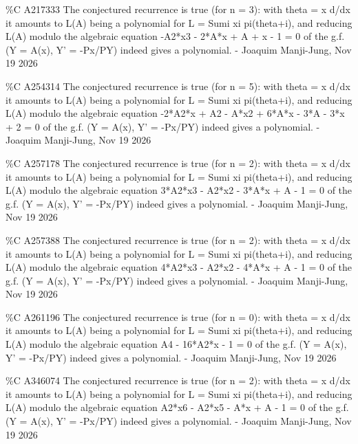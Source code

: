 {\%C A217333 The conjectured recurrence is true (for n = 3): with theta = x d/dx it amounts to L(A) being a polynomial for L = Sumi xi pi(theta+i), and reducing L(A) modulo the algebraic equation -A2*x3 - 2*A*x + A + x - 1 = 0 of the g.f. (Y = A(x), Y' = -Px/PY) indeed gives a polynomial. - Joaquim Manji-Jung, Nov 19 2026\par
\%C A254314 The conjectured recurrence is true (for n = 5): with theta = x d/dx it amounts to L(A) being a polynomial for L = Sumi xi pi(theta+i), and reducing L(A) modulo the algebraic equation -2*A2*x + A2 - A*x2 + 6*A*x - 3*A - 3*x + 2 = 0 of the g.f. (Y = A(x), Y' = -Px/PY) indeed gives a polynomial. - Joaquim Manji-Jung, Nov 19 2026\par
\%C A257178 The conjectured recurrence is true (for n = 2): with theta = x d/dx it amounts to L(A) being a polynomial for L = Sumi xi pi(theta+i), and reducing L(A) modulo the algebraic equation 3*A2*x3 - A2*x2 - 3*A*x + A - 1 = 0 of the g.f. (Y = A(x), Y' = -Px/PY) indeed gives a polynomial. - Joaquim Manji-Jung, Nov 19 2026\par
\%C A257388 The conjectured recurrence is true (for n = 2): with theta = x d/dx it amounts to L(A) being a polynomial for L = Sumi xi pi(theta+i), and reducing L(A) modulo the algebraic equation 4*A2*x3 - A2*x2 - 4*A*x + A - 1 = 0 of the g.f. (Y = A(x), Y' = -Px/PY) indeed gives a polynomial. - Joaquim Manji-Jung, Nov 19 2026\par
\%C A261196 The conjectured recurrence is true (for n = 0): with theta = x d/dx it amounts to L(A) being a polynomial for L = Sumi xi pi(theta+i), and reducing L(A) modulo the algebraic equation A4 - 16*A2*x - 1 = 0 of the g.f. (Y = A(x), Y' = -Px/PY) indeed gives a polynomial. - Joaquim Manji-Jung, Nov 19 2026\par
\%C A346074 The conjectured recurrence is true (for n = 2): with theta = x d/dx it amounts to L(A) being a polynomial for L = Sumi xi pi(theta+i), and reducing L(A) modulo the algebraic equation A2*x6 - A2*x5 - A*x + A - 1 = 0 of the g.f. (Y = A(x), Y' = -Px/PY) indeed gives a polynomial. - Joaquim Manji-Jung, Nov 19 2026\par
}
